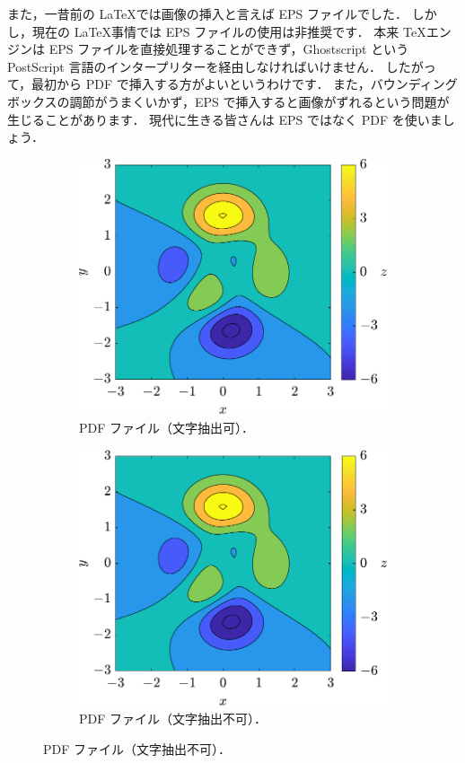 また，一昔前の \LaTeX では画像の挿入と言えば EPS ファイルでした．
しかし，現在の \LaTeX 事情では EPS ファイルの使用は非推奨です．
本来 \TeX エンジンは EPS ファイルを直接処理することができず，Ghostscript という PostScript 言語のインタープリターを経由しなければいけません．
したがって，最初から PDF で挿入する方がよいというわけです．
また，バウンディングボックスの調節がうまくいかず，EPS で挿入すると画像がずれるという問題が生じることがあります．
現代に生きる皆さんは EPS ではなく PDF を使いましょう．

\begin{figure}[tp]
    \centering
    \begin{subfigure}{0.45\columnwidth}
        \centering
        \includegraphics[width=\columnwidth]{figure/comparison1-1.pdf}
        \caption{PDF ファイル（文字抽出可）．}
        \label{subfig:figcomp1_pdf}
    \end{subfigure}
    \hfill %
    \begin{subfigure}{0.45\columnwidth}
        \centering
        \includegraphics[width=\columnwidth]{figure/comparison1-2.pdf}
        \caption{PDF ファイル（文字抽出不可）．}
        \label{subfig:figcomp1_pdf2}
    \end{subfigure}


\end{figure}
